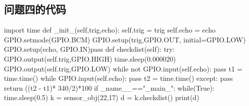 \documentclass{JXUSTmodeling}
\begin{document}
\begin{appendixx}
	\section{问题四的代码}
\begin{python}
	import time
	def _init_(self,trig,echo):
	self.trig = trig
	self.echo = echo
	GPIO.setmode(GPIO.BCM)
	GPIO.setup(trig,GPIO.OUT, initial=GPIO.LOW)
	GPIO.setup(echo, GPIO.IN)pass
	def checkdist(self):
	try:
	GPIO.output(self.trig,GPIO.HIGH)
	time.sleep(0.000020)
	GPIO.output(self.trig,GPIO.LOW)
	while not GPIO.input(self.echo):
	pass
	t1 = time.time()
	while GPIO.input(self.echo):
	pass
	t2 = time.time()
	except:
	pass
	return ((t2 - t1)* 340/2)*100
	if _name__=="_main_":
	while(True):
	time.sleep(0.5)
	k = sensor_obj(22,17)
	d = k.checkdist()
	print(d)
\end{python}		
\end{appendixx}	
\end{document}
